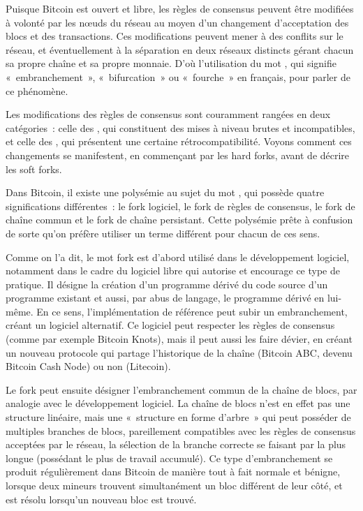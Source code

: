 Puisque Bitcoin est ouvert et libre, les règles de consensus peuvent être modifiées à volonté par les nœuds du réseau au moyen d'un changement d'acceptation des blocs et des transactions. Ces modifications peuvent mener à des conflits sur le réseau, et éventuellement à la séparation en deux réseaux distincts gérant chacun sa propre chaîne et sa propre monnaie. D'où l'utilisation du mot , qui signifie «~embranchement~», «~bifurcation~» ou «~fourche~» en français, pour parler de ce phénomène.

Les modifications des règles de consensus sont couramment rangées en deux catégories~: celle des , qui constituent des mises à niveau brutes et incompatibles, et celle des , qui présentent une certaine rétrocompatibilité. Voyons comment ces changements se manifestent, en commençant par les hard forks, avant de décrire les soft forks.

Dans Bitcoin, il existe une polysémie au sujet du mot , qui possède quatre significations différentes~: le fork logiciel, le fork de règles de consensus, le fork de chaîne commun et le fork de chaîne persistant. Cette polysémie prête à confusion de sorte qu'on préfère utiliser un terme différent pour chacun de ces sens.

Comme on l'a dit, le mot fork est d'abord utilisé dans le développement logiciel, notamment dans le cadre du logiciel libre qui autorise et encourage ce type de pratique. Il désigne la création d'un programme dérivé du code source d'un programme existant et aussi, par abus de langage, le programme dérivé en lui-même. En ce sens, l'implémentation de référence peut subir un embranchement, créant un logiciel alternatif. Ce logiciel peut respecter les règles de consensus (comme par exemple Bitcoin Knots), mais il peut aussi les faire dévier, en créant un nouveau protocole qui partage l'historique de la chaîne (Bitcoin ABC, devenu Bitcoin Cash Node) ou non (Litecoin).

Le fork peut ensuite désigner l'embranchement commun de la chaîne de blocs, par analogie avec le développement logiciel. La chaîne de blocs n'est en effet pas une structure linéaire, mais une «~structure en forme d'arbre~» qui peut posséder de multiples branches de blocs, pareillement compatibles avec les règles de consensus acceptées par le réseau, la sélection de la branche correcte se faisant par la plus longue (possédant le plus de travail accumulé). Ce type d'embranchement se produit régulièrement dans Bitcoin de manière tout à fait normale et bénigne, lorsque deux mineurs trouvent simultanément un bloc différent de leur côté, et est résolu lorsqu'un nouveau bloc est trouvé.


